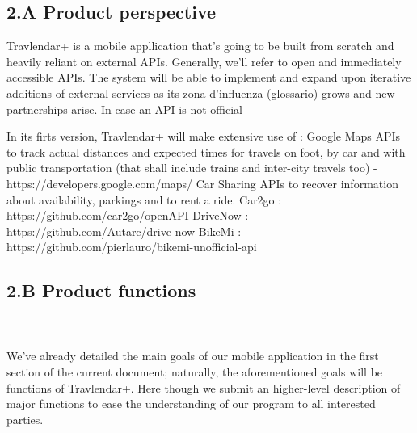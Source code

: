 \subsection{2.A Product perspective}

Travlendar+ is a mobile appllication that’s going to be built from scratch and heavily reliant on external APIs. 
Generally, we’ll refer to open and immediately accessible APIs. The system will be able to implement and expand upon iterative additions of external services as its zona d’influenza (glossario) grows and new partnerships arise.
In case an API is not official

In its firts version, Travlendar+ will make extensive use of :
Google Maps APIs to track actual distances and expected times for travels on foot, by car and with public transportation (that shall include trains and inter-city travels too) - https://developers.google.com/maps/
Car Sharing APIs to recover information about availability, parkings and to rent a ride.
	Car2go : https://github.com/car2go/openAPI
	DriveNow : https://github.com/Autarc/drive-now 
BikeMi : https://github.com/pierlauro/bikemi-unofficial-api


			
		\subsection{2.B Product functions}
		
		\hfill \\ \\ 
 We’ve already detailed the main goals of our mobile application in the first section of the current document; naturally, the aforementioned goals will be functions of Travlendar+.
Here though we submit an higher-level description of major functions to ease the understanding of our program to all interested parties.\\
		
	

